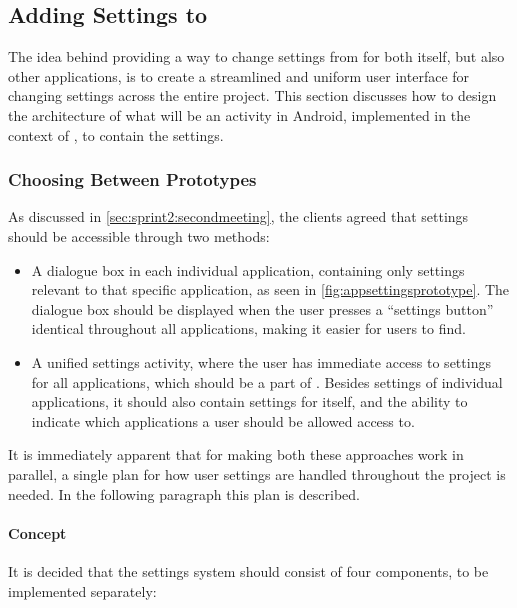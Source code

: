 \subsection{Adding Settings to \giraf}\label{sec:sprint3:designsettings}
The idea behind providing a way to change settings from \launcher for both itself, but also other \giraf applications, is to create a streamlined and uniform user interface for changing settings across the entire project.
This section discusses how to design the architecture of what will be an activity in Android, implemented in the context of \launcher, to contain the settings.

\subsubsection{Choosing Between Prototypes}
As discussed in \cref{sec:sprint2:secondmeeting}, the clients agreed that settings should be accessible through two methods:

\begin{itemize}
	\item A dialogue box in each individual application, containing only settings relevant to that specific application, as seen in \cref{fig:appsettingsprototype}.
	The dialogue box should be displayed when the user presses a ``settings button'' identical throughout all \giraf applications, making it easier for users to find.
	\item A unified settings activity, where the user has immediate access to settings for all \giraf applications, which should be a part of \launcher. 
	Besides settings of individual applications, it should also contain settings for \launcher itself, and the ability to indicate which applications a user should be allowed access to.
\end{itemize}

It is immediately apparent that for making both these approaches work in parallel, a single plan for how user settings are handled throughout the \giraf project is needed. 
In the following paragraph this plan is described.

\paragraph{Concept}
It is decided that the settings system should consist of four components, to be implemented separately:

